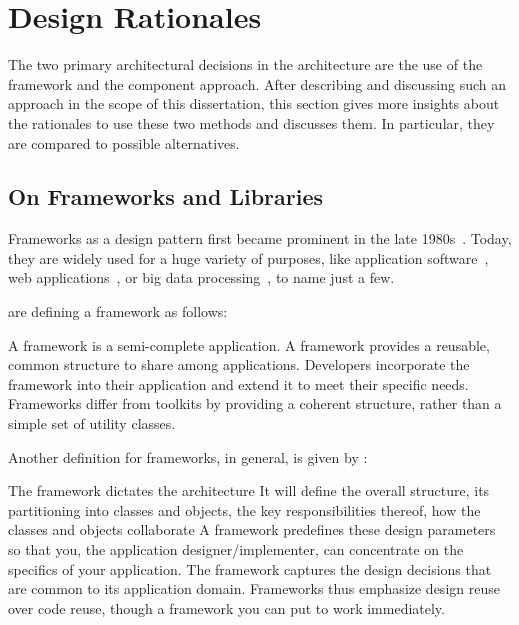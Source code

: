 \section{Design Rationales}%
\label{sec:arch:rationales}

The two primary architectural decisions in the \cobas{} architecture are the use of the framework and the component approach. After describing and discussing such an approach in the scope of this dissertation, this section gives more insights about the rationales to use these two methods and discusses them. In particular, they are compared to possible alternatives.

\subsection{On Frameworks and Libraries}

Frameworks as a design pattern first became prominent in the late 1980s~\cite{Johnson-1988-Framework,Deutsch-1989-Framework}. Today, they are widely used for a huge variety of purposes, like application software~\cite{Cocoa,MFC,Qt}, web applications~\cite{Django,AngularJS,RoR}, or big data processing~\cite{Hadoop}, to name just a few.

 are defining a framework as follows:
\vspace{5mm}
\begin{shadequote}[r]{\Textcite[4]{Tahchiev-2010-Junit}}
	A framework is a semi-complete application. A framework provides a reusable, common structure to share among applications. Developers incorporate the framework into their application and extend it to meet their specific needs. Frameworks differ from toolkits by providing a coherent structure, rather than a simple set of utility classes.
\end{shadequote}

Another definition for frameworks, in general, is given by \citeauthor{Gamma-1995-DesignPattnerns}:
\vspace{5mm}
\begin{shadequote}[r]{\Textcite[26\psq]{Gamma-1995-DesignPattnerns}}
	The framework dictates the architecture \elide{} It will define the overall structure, its partitioning into classes and objects, the key responsibilities thereof, how the classes and objects collaborate \elide{} A framework predefines these design parameters so that you, the application designer/implementer, can concentrate on the specifics of your application. The framework captures the design decisions that are common to its application domain. Frameworks thus emphasize design reuse over code reuse, though a framework \elide{} you can put to work immediately.
\end{shadequote}

